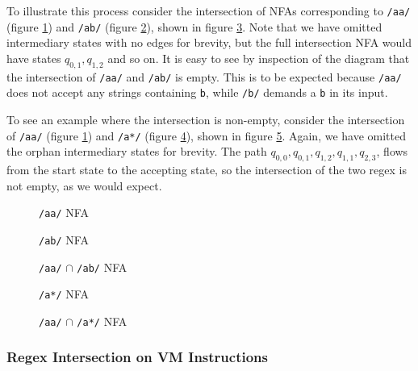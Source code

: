 To illustrate this process consider the intersection of NFAs corresponding
to \verb'/aa/' (figure \ref{fig:NFAaa}) and \verb'/ab/'
(figure \ref{fig:NFAab}), shown in figure \ref{fig:NFAaa:ab}. Note that
we have omitted intermediary states with no edges for brevity, but the
full intersection NFA would have states $q_{0,1}, q_{1,2}$ and so on.
It is easy to see by inspection of the diagram that the intersection of
\verb'/aa/' and \verb'/ab/' is empty. This is to be expected because
\verb'/aa/' does not accept any strings containing \verb'b', while
\verb'/b/' demands a \verb'b' in its input.

To see an example where the intersection is non-empty, consider the
intersection of \verb'/aa/' (figure \ref{fig:NFAaa}) and \verb'/a*/'
(figure \ref{fig:NFAastar}), shown in figure \ref{fig:NFAaa:astar}.
Again, we have omitted the orphan intermediary states for brevity.
The path $q_{0,0}, q_{0,1}, q_{1,2}, q_{1,1}, q_{2,3}$, flows from
the start state to the accepting state, so the intersection of the
two regex is not empty, as we would expect.

\begin{figure}
\centering
\caption{{\tt /aa/} NFA}
    
\label{fig:NFAaa}
\end{figure}

\begin{figure}
\centering
\caption{{\tt /ab/} NFA}
    
\label{fig:NFAab}
\end{figure}


\begin{figure}
\centering
\caption{{\tt /aa/} $\cap$ {\tt /ab/} NFA}
    
\label{fig:NFAaa:ab}
\end{figure}

\begin{figure}
\centering
\caption{{\tt /a*/} NFA}
    
\label{fig:NFAastar}
\end{figure}

\begin{figure}
\centering
\caption{{\tt /aa/} $\cap$ {\tt /a*/} NFA}
    
\label{fig:NFAaa:astar}
\end{figure}

\subsubsection{Regex Intersection on VM Instructions}

